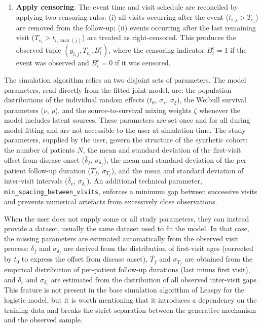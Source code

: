 \documentclass{rapportCS}
\begin{document}
\begin{enumerate}
  \item \textbf{Apply censoring}. The event time and visit schedule are reconciled by applying two censoring rules: (i) all visits occurring after the event ($t_{i,j} > T_{e_i}$) are removed from the follow-up; (ii) events occurring after the last remaining visit ($T_{e_i} > t_{i,\max(j)}$) are treated as right-censored. This produces the observed tuple $(y_{i,j}, T_{e_i}, B^e_i)$, where the censoring indicator $B^e_i = 1$ if the event was observed and $B^e_i = 0$ if it was censored.
\end{enumerate}

\noindent The simulation algorithm relies on two disjoint sets of parameters. The model parameters, read directly from the fitted joint model, are: the population distributions of the individual random effects ($t_0$, $\sigma_\tau$, $\sigma_\xi$), the Weibull survival parameters ($\nu$, $\rho$), and the source-to-survival mixing weights $\zeta$ whenever the model includes latent sources. These parameters are set once and for all during model fitting and are not accessible to the user at simulation time. The study parameters, supplied by the user, govern the structure of the synthetic cohort: the number of patients $N$, the mean and standard deviation of the first-visit offset from disease onset ($\bar{\delta}_f$, $\sigma_{\delta_f}$), the mean and standard deviation of the per-patient follow-up duration ($\overline{T_f}$, $\sigma_{T_f}$), and the mean and standard deviation of inter-visit intervals ($\bar{\delta}_v$, $\sigma_{\delta_v}$). An additional technical parameter, \texttt{min\_spacing\_between\_visits}, enforces a minimum gap between successive visits and prevents numerical artefacts from excessively close observations.

When the user does not supply some or all study parameters, they can instead provide a dataset, usually the same dataset used to fit the model. In that case, the missing parameters are estimated automatically from the observed visit process: $\bar{\delta}_f$ and $\sigma_{\delta_f}$ are derived from the distribution of first-visit ages (corrected by $t_0$ to express the offset from disease onset), $\overline{T_f}$ and $\sigma_{T_f}$ are obtained from the empirical distribution of per-patient follow-up durations (last minus first visit), and $\bar{\delta}_v$ and $\sigma_{\delta_v}$ are estimated from the distribution of all observed inter-visit gaps. This feature is not present in the base simulation algorithm of Leaspy for the logistic model, but it is worth mentioning that it introduces a dependency on the training data and breaks the strict separation between the generative mechanism and the observed sample. 
\end{document}
